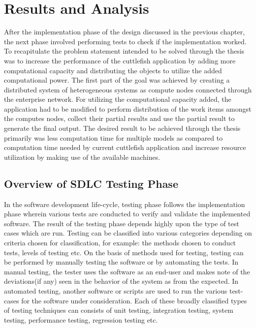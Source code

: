 \chapter{Results and Analysis}

After the implementation phase of the design discussed in the previous chapter, the next phase involved performing tests to check if the implementation worked. To recapitulate the problem statement intended to be solved through the thesis was to increase the performance of the cuttlefish application by adding more computational capacity and distributing the objects to utilize the added computational power. The first part of the goal was achieved by creating a distributed system of heterogeneous systems as compute nodes connected through the enterprise network. For utilizing the computational capacity added, the application had to be modified to perform distribution of the work items amongst the computes nodes, collect their partial results and use the partial result to generate the final output. The desired result to be achieved through the thesis primarily was less computation time for multiple models as compared to computation time needed by current cuttlefish application and increase resource utilization by making use of the available machines.\newline

\section{Overview of SDLC Testing Phase}

In the software development life-cycle, testing phase follows the implementation phase wherein various tests are conducted to verify and validate the implemented software. The result of the testing phase depends highly upon the type of test cases which are run. Testing can be classified into various categories depending on criteria chosen for classification, for example: the methods chosen to conduct tests, levels of testing etc. On the basis of methods used for testing, testing can be performed by manually testing the software or by automating the tests. In manual testing, the tester uses the software as an end-user and makes note of the deviations(if any) seen in the behavior of the system as from the expected. In automated testing, another software or scripts are used to run the various test-cases for the software under consideration. Each of these broadly classified types of testing techniques can consists of unit testing, integration testing, system testing, performance testing, regression testing etc.\newline

